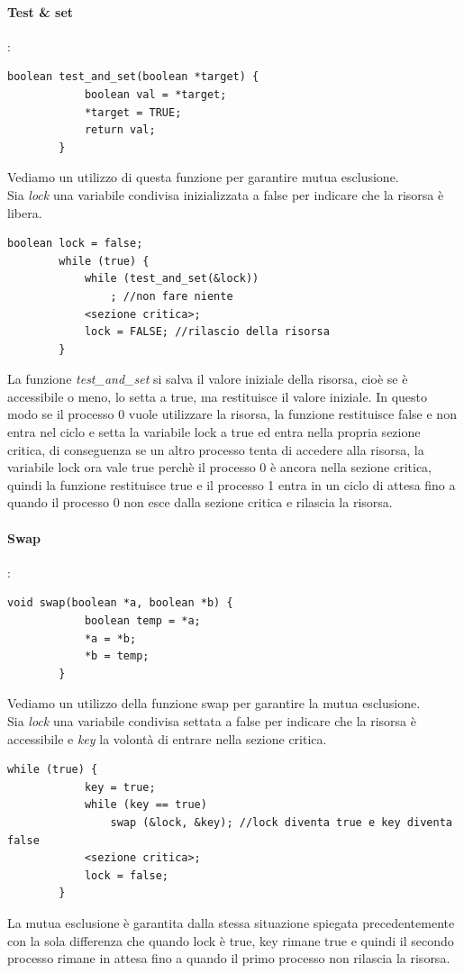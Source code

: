 \documentclass[12pt, letterpaper]{report}
\begin{document}
	\paragraph{\color{red}Test \& set}: \\
	\begin{lstlisting}[style=pascalstyle]
		boolean test_and_set(boolean *target) {
			boolean val = *target;
			*target = TRUE;
			return val;
		}
	\end{lstlisting}
	Vediamo un utilizzo di questa funzione per garantire mutua esclusione. \\
	Sia \textit{lock} una variabile condivisa inizializzata a false per indicare che la risorsa è libera.
	\begin{lstlisting}[style=pascalstyle]
		boolean lock = false;
		while (true) {
			while (test_and_set(&lock))
				; //non fare niente
			<sezione critica>;
			lock = FALSE; //rilascio della risorsa
		}
	\end{lstlisting}
	La funzione \textit{test\_and\_set} si salva il valore iniziale della risorsa, cioè se è accessibile o meno, lo setta a true, ma restituisce il valore iniziale. In questo modo se il processo 0 vuole utilizzare la risorsa, la funzione restituisce false e non entra nel ciclo e setta la variabile lock a true ed entra nella propria sezione critica, di conseguenza se un altro processo tenta di accedere alla risorsa, la variabile lock ora vale true perchè il processo 0 è ancora nella sezione critica, quindi la funzione restituisce true e il processo 1 entra in un ciclo di attesa fino a quando il processo 0 non esce dalla sezione critica e rilascia la risorsa.
	\paragraph{\color{red}Swap}: \\
	\begin{lstlisting}[style=pascalstyle]
		void swap(boolean *a, boolean *b) {
			boolean temp = *a;
			*a = *b;
			*b = temp;
		}
	\end{lstlisting}
	Vediamo un utilizzo della funzione swap per garantire la mutua esclusione. \\
	Sia \textit{lock} una variabile condivisa settata a false per indicare che la risorsa è accessibile e \textit{key} la volontà di entrare nella sezione critica.
	\begin{lstlisting}[style=pascalstyle]
		while (true) {
			key = true;
			while (key == true)
				swap (&lock, &key); //lock diventa true e key diventa false
			<sezione critica>;
			lock = false;
		}
	\end{lstlisting}
	La mutua esclusione è garantita dalla stessa situazione spiegata precedentemente con la sola differenza che quando lock è true, key rimane true e quindi il secondo processo rimane in attesa fino a quando il primo processo non rilascia la risorsa.
\end{document}
